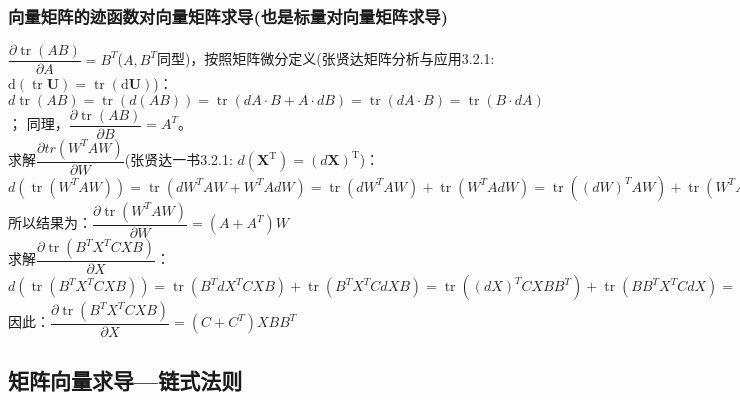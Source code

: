 \documentclass[UTF8]{article}
\begin{document}
    \subsubsection{向量矩阵的迹函数对向量矩阵求导(也是标量对向量矩阵求导)}
    $\dfrac{\partial \operatorname{tr}(A B)}{\partial A}=B^{T}$($A,B^T$同型)，按照矩阵微分定义(张贤达矩阵分析与应用3.2.1: \quad $\mathrm{d}(\operatorname{tr} \boldsymbol{U})=\operatorname{tr}(\mathrm{d} \boldsymbol{U})$)：
    \\
    $d\operatorname{tr}(AB)=\operatorname{tr}(d(AB))=\operatorname{tr}(dA \cdot B + A\cdot dB)=\operatorname{tr}(dA \cdot B)=\operatorname{tr}(B \cdot dA)$；
    同理，$\dfrac{\partial \operatorname{tr}(A B)}{\partial B}=A^{T}$。
    \\
    求解$\dfrac{\partial t r\left(W^{T} A W\right)}{\partial W}$(张贤达一书3.2.1: $d\left(\boldsymbol{X}^{\mathrm{T}}\right)=(d \boldsymbol{X})^{\mathrm{T}}$)：
    \\
    $d\left(\operatorname{tr}\left(W^{T} A W\right)\right)=\operatorname{tr}\left(d W^{T} A W+W^{T} A d W\right)=\operatorname{tr}\left(d W^{T} A W\right)+\operatorname{tr}\left(W^{T} A d W\right)=\operatorname{tr}\left((d W)^{T} A W\right)+\operatorname{tr}\left(W^{T} A d W\right)=\operatorname{tr}\left(W^{T} A^{T} d W\right)+\operatorname{tr}\left(W^{T} A d W\right)=\operatorname{tr}\left(W^{T}\left(A+A^{T}\right) d W\right)$
    \\
    所以结果为：$\dfrac{\partial \operatorname{tr}\left(W^{T} A W\right)}{\partial W}=\left(A+A^{T}\right) W$
    \\
    求解$\dfrac{\partial \operatorname{tr}\left(B^{T} X^{T} C X B\right)}{\partial X}$：
    \\
    $d\left(\operatorname{tr}\left(B^{T} X^{T} C X B\right)\right)=\operatorname{tr}\left(B^{T} d X^{T} C X B\right)+\operatorname{tr}\left(B^{T} X^{T} C d X B\right)=\operatorname{tr}\left((d X)^{T} C X B B^{T}\right)+\operatorname{tr}\left(B B^{T} X^{T} C d X\right)=\operatorname{tr}\left(B B^{T} X^{T} C^{T} d X\right)+\operatorname{tr}\left(B B^{T} X^{T} C d X\right)=\operatorname{tr}\left(\left(B B^{T} X^{T} C^{T}+B B^{T} X^{T} C\right) d X\right)$
    \\
    因此：$\dfrac{\partial \operatorname{tr}\left(B^{T} X^{T} C X B\right)}{\partial X}=\left(C+C^{T}\right) X B B^{T}$

    \subsection{矩阵向量求导---链式法则}
\end{document}

